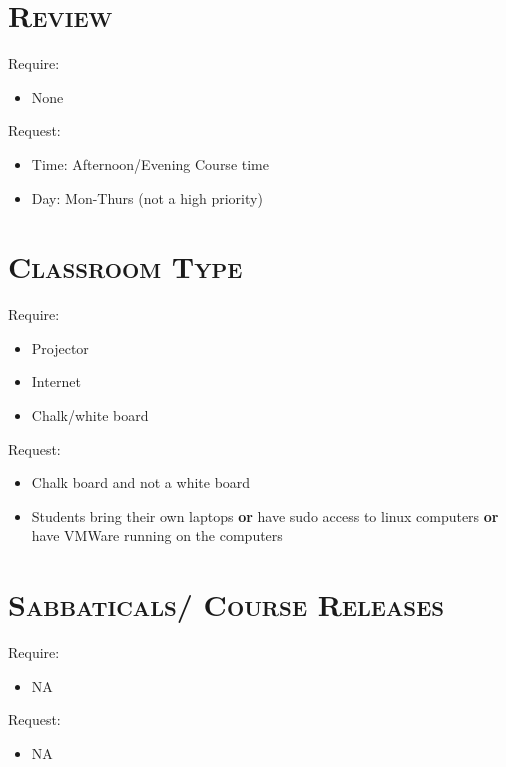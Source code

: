 \begin{resume}




\section{\textsc{Review}}


Require:
\begin{itemize}
\item None
\end{itemize}

Request:
\begin{itemize}
\item Time: Afternoon/Evening Course time
\item Day: Mon-Thurs (not a high priority) 
\end{itemize}







\section{\textsc{Classroom Type}}
Require:
\begin{itemize}
\item Projector
\item Internet
\item Chalk/white board
\end{itemize}

Request:
\begin{itemize}
\item Chalk board and not a white board
\item Students bring their own laptops \textbf{or} have sudo access to linux computers \textbf{or} have VMWare running on the computers
\end{itemize}



\section{\textsc{Sabbaticals/ Course Releases}}
Require:
\begin{itemize}
\item NA
\end{itemize}

Request:
\begin{itemize}
\item NA 
\end{itemize}







\end{resume}
